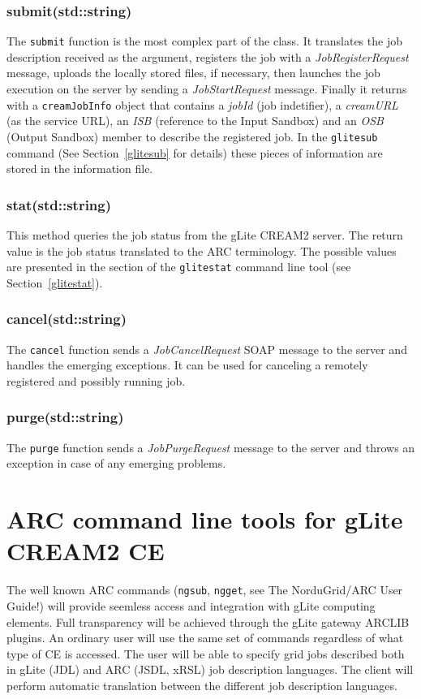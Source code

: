\documentclass{article}
\begin{document}
\subsubsection*{submit(std::string)}
The \texttt{submit} function is the most complex part of the class. It translates the job description received as the argument, registers the job with a \textit{JobRegisterRequest} message, uploads the locally stored files, if necessary, then launches the job execution on the server by sending a \textit{JobStartRequest} message. Finally it returns with a \texttt{creamJobInfo} object that contains a \textit{jobId} (job indetifier), a \textit{creamURL} (as the service URL), an \textit{ISB} (reference to the Input Sandbox) and an \textit{OSB} (Output Sandbox) member to describe the registered job. In the \texttt{glitesub} command (See Section~\ref{glitesub} for details) these pieces of information are stored in the information file.

\subsubsection*{stat(std::string)}
This method queries the job status from the gLite CREAM2 server. The return value is the job status translated to the ARC terminology. The possible values are presented in the section of the \texttt{glitestat} command line tool (see Section~\ref{glitestat}).

\subsubsection*{cancel(std::string)}
The \texttt{cancel} function sends a \textit{JobCancelRequest} SOAP message to the server and handles the emerging exceptions. It can be used for canceling a remotely registered and possibly running job.

\subsubsection*{purge(std::string)}
The \texttt{purge} function sends a \textit{JobPurgeRequest} message to the server and throws an exception in case of any emerging problems.

\section{ARC command line tools for gLite CREAM2 CE}
\label{Users guide}
The well known ARC commands (\texttt{ngsub}, \texttt{ngget}, see The NorduGrid/ARC User Guide\cite{userguide}!) will provide seemless access and integration with gLite computing elements. Full transparency will be achieved through the gLite gateway ARCLIB plugins. An ordinary user will use the same set of commands regardless of what type of CE is accessed. The user will be able to specify grid jobs described both in gLite (JDL) and ARC (JSDL, xRSL) job description languages. The client will perform automatic translation between the different job description languages.
\end{document}
